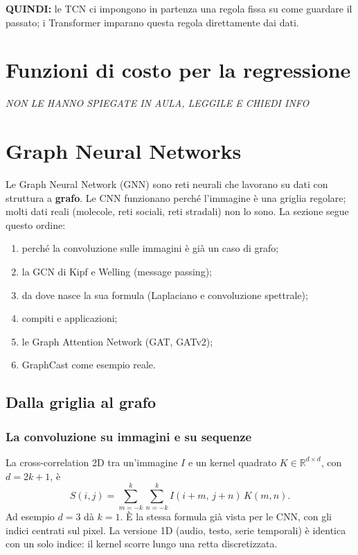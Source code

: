\documentclass[11pt,a4paper]{article}
\newcommand{\R}{\mathbb{R}}
\begin{document}
\textbf{QUINDI:} le TCN ci impongono in partenza una regola fissa su come guardare il passato; i Transformer imparano
questa regola direttamente dai dati.

\section{Funzioni di costo per la regressione}
\textit{NON LE HANNO SPIEGATE IN AULA, LEGGILE E CHIEDI INFO}

\section{Graph Neural Networks}
\label{sec:gnn}
 
Le Graph Neural Network (GNN) sono reti neurali che lavorano su dati con
struttura a \textbf{grafo}. Le CNN funzionano perché l'immagine è una griglia
regolare; molti dati reali (molecole, reti sociali, reti stradali) non lo sono.
La sezione segue questo ordine:
\begin{enumerate}
  \item perché la convoluzione sulle immagini è già un caso di grafo;
  \item la GCN di Kipf e Welling (message passing);
  \item da dove nasce la sua formula (Laplaciano e convoluzione spettrale);
  \item compiti e applicazioni;
  \item le Graph Attention Network (GAT, GATv2);
  \item GraphCast come esempio reale.
\end{enumerate}
 
\subsection{Dalla griglia al grafo}
 
\subsubsection{La convoluzione su immagini e su sequenze}
La cross-correlation 2D tra un'immagine $I$ e un kernel quadrato
$K\in\R^{d\times d}$, con $d=2k+1$, è
\[
S(i,j)=\sum_{m=-k}^{k}\sum_{n=-k}^{k} I(i+m,\,j+n)\,K(m,n).
\]
Ad esempio $d=3$ dà $k=1$. È la stessa formula già vista per le CNN, con gli
indici centrati sul pixel. La versione 1D (audio, testo, serie temporali) è
identica con un solo indice: il kernel scorre lungo una retta discretizzata.
 
\end{document}
